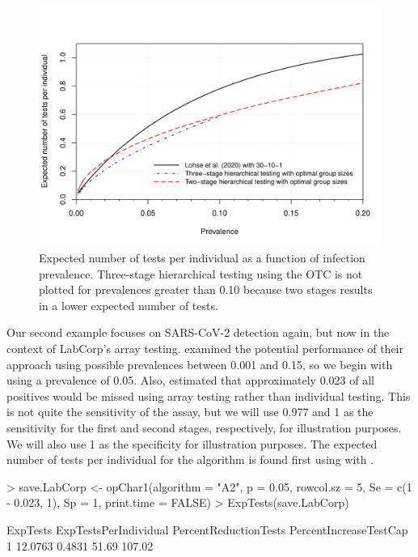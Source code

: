 \begin{figure}
\noindent \begin{centering}
\includegraphics[scale=0.55]{figures/Lohse.pdf}
\par\end{centering}
\caption{Expected number of tests per individual as a function of infection
prevalence. Three-stage hierarchical testing using the OTC is not
plotted for prevalences greater than 0.10 because two stages results
in a lower expected number of tests. \label{fig:Expected-number-of}}
\end{figure}

Our second example focuses on SARS-CoV-2 detection again, but now
in the context of LabCorp's array testing. \citet{LabCorp} examined
the potential performance of their approach using possible prevalences
between 0.001 and 0.15, so we begin with using a prevalence of 0.05.
Also, \citet{LabCorp} estimated that approximately 0.023 of all positives
would be missed using array testing rather than individual testing.
This is not quite the sensitivity of the assay, but we will use 0.977
and 1 as the sensitivity for the first and second stages, respectively,
for illustration purposes. We will also use 1 as the specificity for
illustration purposes. The expected number of tests per individual
for the algorithm is found first using  with .

\noindent 

\begin{Schunk}
\begin{Sinput}
> save.LabCorp <- opChar1(algorithm = "A2", p = 0.05, rowcol.sz = 5,
     Se = c(1 - 0.023, 1), Sp = 1, print.time = FALSE)
> ExpTests(save.LabCorp)
\end{Sinput}
\begin{Soutput}
  ExpTests ExpTestsPerIndividual PercentReductionTests PercentIncreaseTestCap
1  12.0763                0.4831                 51.69                 107.02
\end{Soutput}
\end{Schunk}

